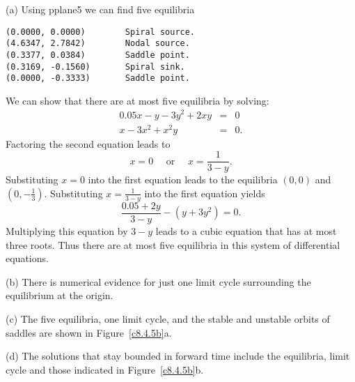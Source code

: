 \documentclass{ximera}
\begin{document}
\soln  (a)  Using {\sf pplane5} we can find five equilibria
\begin{verbatim}
(0.0000, 0.0000)        Spiral source.           
(4.6347, 2.7842)        Nodal source.            
(0.3377, 0.0384)        Saddle point.            
(0.3169, -0.1560)       Spiral sink.             
(0.0000, -0.3333)       Saddle point.            
\end{verbatim}
We can show that there are at most five equilibria by solving:
\begin{eqnarray*}
0.05x - y - 3y^2 + 2xy & = & 0\\
x - 3x^2 + x^2y & = & 0.
\end{eqnarray*}  
Factoring the second equation leads to 
\[
x=0 \quad \mbox{ or } \quad x = \frac{1}{3-y}.
\]
Substituting $x=0$ into the first equation leads to the equilibria
$(0,0)$ and $(0,-\frac{1}{3})$. Substituting $x = \frac{1}{3-y}$ into the
first equation yields
\[
\frac{0.05+2y}{3-y} -(y+3y^2)=0.
\]
Multiplying this equation by $3-y$ leads to a cubic equation that has at most
three roots.  Thus there are at most five equilibria in this system of
differential equations.

\noindent (b) There is numerical evidence for just one limit cycle
surrounding the equilibrium at the origin.

\noindent (c)  The five equilibria, one limit cycle, and the stable and
unstable orbits of saddles are shown in Figure~\ref{c8.4.5b}a.

\noindent (d)  The solutions that stay bounded in forward time include the
equilibria, limit cycle and those indicated in Figure~\ref{c8.4.5b}b.

\begin{figure}[htb]
                       \centerline{%
			}
\end{figure}
\end{document}
